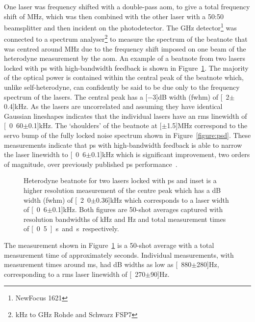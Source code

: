 One laser was frequency shifted with a double-pass \gls{aom}, to give a total frequency shift of \unit[160]{MHz}, which was then combined with the other laser with a 50:50 beamsplitter and then incident on the photodetector.
The \unit[1]{GHz} detector\footnote{NewFocus 1621} was connected to a spectrum analyser\footnote{\unit[9]{kHz} to \unit[7]{GHz} Rohde and Schwarz FSP7} to measure the spectrum of the beatnote that was centred around \unit[160]{MHz} due to the frequency shift imposed on one beam of the heterodyne measurement by the \gls{aom}.
An example of a beatnote from two lasers locked with \gls{ps} with high-bandwidth feedback is shown in Figure~\ref{figure:two_laser_beatnote}.
The majority of the optical power is contained within the central peak of the beatnote which, unlike self-heterodyne, can confidently be said to be due only to the frequency spectrum of the lasers.
The central peak has a \unit[$-3$]{dB} width (\gls{fwhm}) of \unit[2$\pm$0.4]{kHz}.
As the lasers are uncorrelated and assuming they have identical Gaussian lineshapes indicates that the individual lasers have an \gls{rms} linewidth of \unit[0.60$\pm$0.1]{kHz}.
The `shoulders' of the beatnote at \unit[$\pm$1.5]{MHz} correspond to the servo bump of the fully locked noise spectrum shown in Figure~\ref{figure:psd}.
These measurements indicate that \gls{ps} with high-bandwidth feedback is able to narrow the laser linewidth to \unit[0.6$\pm$0.1]{kHz} which is significant improvement, two orders of magnitude, over previously published \gls{ps} performance~\cite{torii_laser-phase_2012}.

\begin{figure}
\center

\caption[Heterodyne beatnote for two external cavity diode lasers locked with high-bandwidth polarisation spectroscopy.]{Heterodyne beatnote for two lasers locked with \gls{ps} and inset is a higher resolution measurement of the centre peak which has a \unit[-3]{dB} width (\gls{fwhm}) of \unit[2.0$\pm$0.36]{kHz} which corresponds to a laser width of \unit[0.6$\pm$0.1]{kHz}.
Both figures are 50-shot averages captured with resolution bandwidths of \unit[30]{kHz} and \unit[100]{Hz} and total measurement times of \unit[0.5]{s} and \unit[2]{s} respectively.}
\label{figure:two_laser_beatnote}
\end{figure}

The measurement shown in Figure~\ref{figure:two_laser_beatnote} is a 50-shot average with a total measurement time of approximately \unit[2]{seconds}.
Individual measurements, with measurement times around \unit[40]{ms}, had \unit[-3]{dB} widths as low as \unit[880$\pm$280]{Hz}, corresponding to a \gls{rms} laser linewidth of \unit[270$\pm$90]{Hz}.


